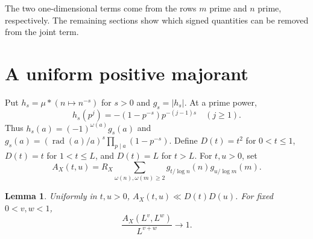 \documentclass[11pt]{article}
\newtheorem{lemma}[theorem]{Lemma}
\newcommand{\rad}{\operatorname{rad}}
\begin{document}
The two one-dimensional terms come from the rows $m$ prime and
$n$ prime, respectively. The remaining sections show which signed
quantities can be removed from the joint term.

\section{A uniform positive majorant}

Put $h_s=\mu*(n\mapsto n^{-s})$ for $s>0$ and $g_s=|h_s|$.
At a prime power,
\[
 h_s(p^j)=-(1-p^{-s})p^{-(j-1)s}\quad(j\ge1).
\]
Thus $h_s(a)=(-1)^{\omega(a)}g_s(a)$ and
$g_s(a)=(\rad(a)/a)^s\prod_{p\mid a}(1-p^{-s})$.
Define $D(t)=t^2$ for $0<t\le1$, $D(t)=t$ for $1<t\le L$,
and $D(t)=L$ for $t>L$. For $t,u>0$, set
\[
 A_X(t,u)=R_X\sum_{\omega(n),\omega(m)\ge2}
        g_{t/\log n}(n)g_{u/\log m}(m).
\]

\begin{lemma}\label{pos}
Uniformly in $t,u>0$, $A_X(t,u)\ll D(t)D(u)$. For fixed
$0<v,w<1$,
\[
 \frac{A_X(L^v,L^w)}{L^{v+w}}\longrightarrow1.
\]
\end{lemma}
\end{document}
